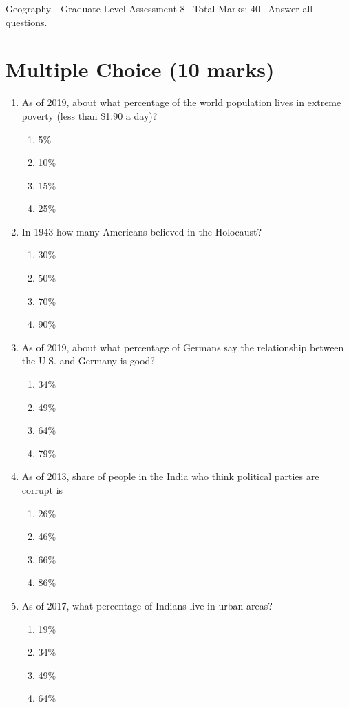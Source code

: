 \documentclass[12pt]{article}
\begin{document}
\begin{center}
Geography - Graduate Level Assessment 8 \
Total Marks: 40 \
Answer all questions.
\end{center}

\section*{Multiple Choice (10 marks)}
\begin{enumerate}[label=\arabic*.]
\item As of 2019, about what percentage of the world population lives in extreme poverty (less than \$1.90 a day)?
\begin{enumerate}[label=(\alph*)]
    \item 5\%
    \item 10\%
    \item 15\%
    \item 25\%
\end{enumerate}
\item In 1943 how many Americans believed in the Holocaust?
\begin{enumerate}[label=(\alph*)]
    \item 30\%
    \item 50\%
    \item 70\%
    \item 90\%
\end{enumerate}
\item As of 2019, about what percentage of Germans say the relationship between the U.S. and Germany is good?
\begin{enumerate}[label=(\alph*)]
    \item 34\%
    \item 49\%
    \item 64\%
    \item 79\%
\end{enumerate}
\item As of 2013, share of people in the India who think political parties are corrupt is
\begin{enumerate}[label=(\alph*)]
    \item 26\%
    \item 46\%
    \item 66\%
    \item 86\%
\end{enumerate}
\item As of 2017, what percentage of Indians live in urban areas?
\begin{enumerate}[label=(\alph*)]
    \item 19\%
    \item 34\%
    \item 49\%
    \item 64\%
\end{enumerate}
\end{enumerate}
\end{document}
